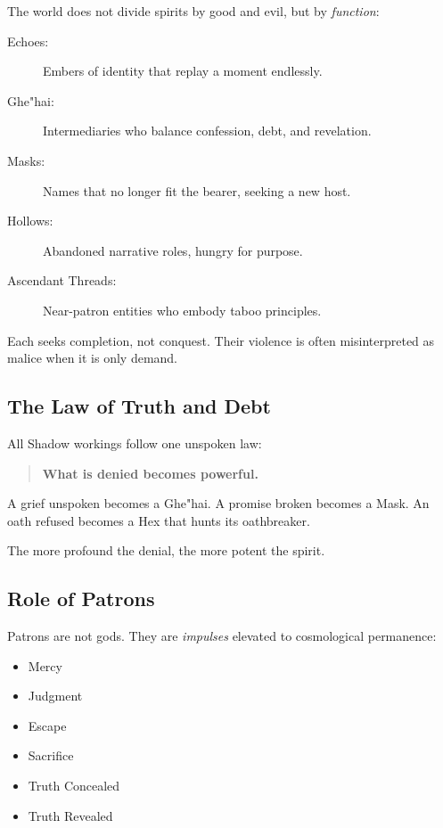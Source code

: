 \documentclass[11pt]{book}
\begin{document}
The world does not divide spirits by good and evil,  
but by \emph{function}:

\begin{description}
    \item[Echoes:] Embers of identity that replay a moment endlessly.
    \item[Ghe"hai:] Intermediaries who balance confession, debt, and revelation.
    \item[Masks:] Names that no longer fit the bearer, seeking a new host.
    \item[Hollows:] Abandoned narrative roles, hungry for purpose.
    \item[Ascendant Threads:] Near-patron entities who embody taboo principles.
\end{description}

Each seeks completion, not conquest.  
Their violence is often misinterpreted as malice  
when it is only demand.

\subsection{The Law of Truth and Debt}

All Shadow workings follow one unspoken law:

\begin{quote}
\textbf{What is denied becomes powerful.}
\end{quote}

A grief unspoken becomes a Ghe"hai.  
A promise broken becomes a Mask.  
An oath refused becomes a Hex that hunts its oathbreaker.  

The more profound the denial, the more potent the spirit.

\subsection{Role of Patrons}

Patrons are not gods.  
They are \emph{impulses} elevated to cosmological permanence:
\begin{itemize}
    \item Mercy
    \item Judgment
    \item Escape
    \item Sacrifice
    \item Truth Concealed
    \item Truth Revealed
\end{itemize}
\end{document}
